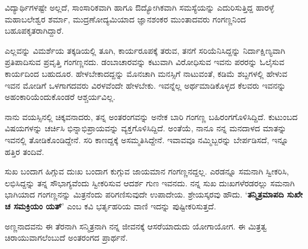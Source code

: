 {ವಿದ್ಯಾರ್ಥಿಗಳಷ್ಟೇ ಅಲ್ಲದೆ, ಸಾಂಸಾರಿಕವಾಗಿ ಹಾಗೂ ಔದ್ಯೋಗಿಕವಾಗಿ ಸಮಸ್ಯೆಯನ್ನು ಎದುರಿಸುತ್ತಿದ್ದ ಹಾರಳ್ಳೆ ಮಹಾಬಲೇಶ್ವರ ಶರ್ಮಾ, ಮುದ್ರಣೋದ್ಯಮಿಯಾದ ಜ್ಞಾನಶಂಕರ ಮುಂತಾದವರು ಗಂಗಣ್ಣನಿಂದ ಬಹೂಪಕೃತರಾಗಿದ್ದಾರೆ.

ಎಲ್ಲವನ್ನು ವಿಮರ್ಶೆಯ ತಕ್ಕಡಿಯಲ್ಲಿ ತೂಗಿ, ಕಾರ್ಯರೂಪಕ್ಕೆ ತರುವ, ತನಗೆ ಸರಿಯೆನಿಸಿದ್ದನ್ನು ನಿರ್ದಾಕ್ಷಿಣ್ಯವಾಗಿ ಪ್ರತಿಪಾದಿಸುವ ಪ್ರವೃತ್ತಿ ಗಂಗಣ್ಣನದು. ಡಂಬಾಚಾರವನ್ನು ಕಟುವಾಗಿ ವಿರೋಧಿಸುವ ಇವನು ಪರರನ್ನು ಓಲೈಸುವ ಕಾರ್ಯದಿಂದ ಬಹುದೂರ. ಹೇಳಬೇಕಾದದ್ದನ್ನು ಮೊನಚಾಗಿ ಮನಸ್ಸಿಗೆ ನಾಟುವಂತೆ, ಕಡಿಮೆ ಶಬ್ದಗಳಲ್ಲಿ ಹೇಳುವ ಇವನ ಮೋಡಿಗೆ ಒಳಗಾಗದವರು ವಿರಳವೆಂದೇ ಹೇಳಬೇಕು. ಇವನ್ನೆಲ್ಲ ಅರ್ಥಮಾಡಿಕೊಳ್ಳದ ಕೆಲವರು ಇವನನ್ನು ಅಹಂಕಾರಿಯೆಂದುಕೊಂಡರೆ ಆಶ್ಚರ್ಯವಿಲ್ಲ.

ನಾನು ವಯಸ್ಸಿನಲ್ಲಿ ಚಿಕ್ಕವನಾದರು, ತನ್ನ ಅಂತರಂಗವನ್ನು ಅನೇಕ ಬಾರಿ ಗಂಗಣ್ಣ ಬಹಿರಂಗಗೊಳಿಸಿದ್ದಿದೆ. ಕುಟುಂಬದ ವಿಷಯಗಳನ್ನು ಚರ್ಚಿಸಿ ಭಿನ್ನಾಭಿಪ್ರಾಯವನ್ನು ವ್ಯಕ್ತಗೊಳಿಸಿದ್ದಿದೆ. ಅಂತೆಯೆ, ನಾನೂ ನನ್ನ ಮನದಾಳದ ಮಾತನ್ನು ಇವನಲ್ಲಿ ತೋಡಿಕೊಂಡಿದ್ದೇನೆ. ಸರಿ ಕಾಣದ್ದಕ್ಕೆ ಅಸಮ್ಮತಿಸಿದ್ದೇನೆ. ಇವಾವವೂ ನಮ್ಮಿಬ್ಬರನ್ನು ಬೇರ್ಪಡಿಸದೆ, ಇನ್ನೂ ಹತ್ತಿರ ತಂದಿವೆ.

ಸುಖ ಬಂದಾಗ ಹಿಗ್ಗುವ ದುಃಖ ಬಂದಾಗ ಕುಗ್ಗುವ ಜಾಯಮಾನ ಗಂಗಣ್ಣನದ್ದಲ್ಲ. ಎರಡನ್ನೂ ಸಮನಾಗಿ ಸ್ವೀಕರಿಸಿ, ಲಭಿಸಿದ್ದನ್ನು ತನ್ನ ಸೌಭಾಗ್ಯವೆಂದು ಸ್ವೀಕರಿಸುವ ಆದರ್ಶ ಗುಣ ಇವನದು. ನನ್ನ ಸುಖ  \enginline{-}  ದುಃಖಗಳೆರಡರಲ್ಲು ಸಮನಾಗಿ ಭಾಗಿಯಾದ ಗಂಗಣ್ಣನನ್ನು ಮಿತ್ರನೆಂದು ಪರಿಗಣಿಸುವುದೇ ಉಪಾದೇಯ. ಶ್ರೇಯಸ್ಕರವು ಹೌದು. ‘\textbf{ತನ್ಮಿತ್ರಮಾಪದಿ ಸುಖೇ ಚ ಸಮಕ್ರಿಯಂ ಯತ್}’   \enginline{-}   ಎಂಬ ಕವಿ ಭರ್ತೃಹರಿಯ ವಾಣಿ ಇದನ್ನು ಪುಷ್ಟೀಕರಿಸುತ್ತದೆ.

ಅಣ್ಣನಾದವನು ಈ ತೆರನಾಗಿ ಸನ್ಮಿತ್ರನಾಗಿ ನನ್ನ ಜೀವನಕ್ಕೆ ಆಸರೆಯಾದುದು ಯೋಗಾಯೋಗ. ಈ ಮಿತ್ರತ್ವ ಚಿರಾಯುವಾಗಲೆಂಬುದೆ ಅಂತರಂಗದ ಪ್ರಾರ್ಥನೆ.

\articleend
}

